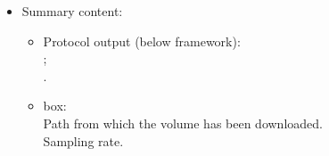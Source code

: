 \begin{itemize}
\begin{itemize}
   \end{itemize}
   
   \item Summary content:
    
    \begin{itemize}
     \item Protocol output (below \scipion framework):\\ ;\\ .
     \item {} box:\\Path from which the volume has been downloaded.\\Sampling rate.
    \end{itemize}
  
  \end{itemize}
